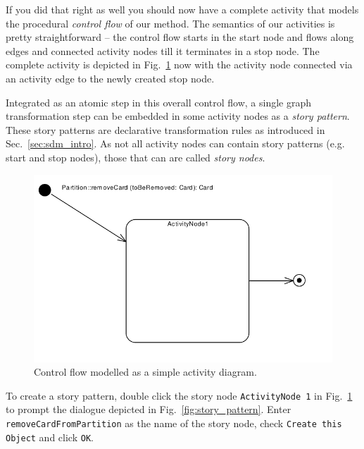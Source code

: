 If you did that right as well you should now have a complete activity that models the procedural \emph{control flow} of our method.  
The semantics of our activities is pretty straightforward -- the control flow starts in the start node and flows along edges and connected activity nodes till it terminates in a stop node.  
The complete activity is depicted in Fig.~\ref{fig:sdm_complete_control_flow_simple} now with the activity node connected via an activity edge to the newly created stop node.

\label{story-pattern}

Integrated as an atomic step in this overall control flow, a single graph
transformation step can be embedded in some activity nodes as a \emph{story pattern}.  
These story patterns are declarative transformation rules as introduced in Sec.~\ref{sec:sdm_intro}.  
As not all activity nodes can contain story
patterns (e.g. start and stop nodes), those that can are called \emph{story nodes}. 

\begin{figure}[htp]
\begin{center}
  \includegraphics[width=\textwidth]{pics/sdmBilder/removeCard/sdm06RAW.pdf}
  \caption{Control flow modelled as a simple activity diagram.}  
  \label{fig:sdm_complete_control_flow_simple}
\end{center}
\end{figure}

To create a story pattern, double click the story node \texttt{ActivityNode 1} in Fig.~\ref{fig:sdm_complete_control_flow_simple} to prompt the dialogue depicted in Fig.~\ref{fig:story_pattern}.  
Enter \texttt{remove\-Card\-From\-Partition} as the name of the story node, check \texttt{Create this Object} and click \texttt{OK}.

